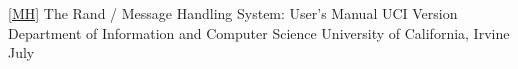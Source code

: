 \let\journalinfo=\jourinfo
\let\thesis=\book			%
\let\thesisinfo=\bookinfo		%


\ref{MH}
\paper The Rand \MH/ Message Handling System: User's Manual
\paperinfo UCI Version
\other
\publ Department of Information and Computer Science
\publaddr University of California, Irvine
\month July
\endref

\endreferences

